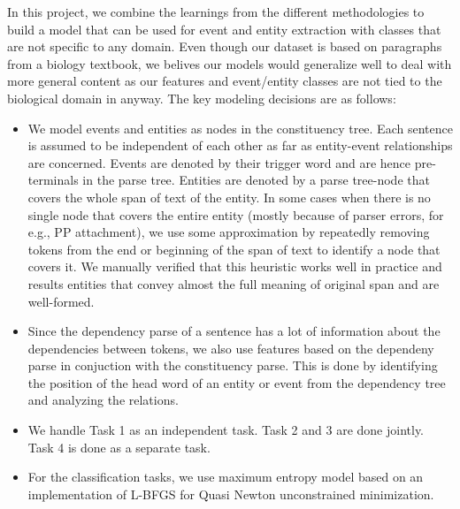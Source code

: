 In this project, we combine the learnings from the different methodologies to build a model that can be used for event and entity extraction with classes that are not specific to any domain. Even though our dataset is based on paragraphs from a biology textbook, we belives our models would generalize well to deal with more general content as our features and event/entity classes are not tied to the biological domain in anyway. The key modeling decisions are as follows:

\begin{itemize}
\item We model events and entities as nodes in the constituency tree. Each sentence is assumed to be independent of each other as far as entity-event relationships are concerned. Events are denoted by their trigger word and are hence pre-terminals in the parse tree. Entities are denoted by a parse tree-node that covers the whole span of text of the entity. In some cases when there is no single node that covers the entire entity (mostly because of parser errors, for e.g., PP attachment), we use some approximation by repeatedly removing tokens from the end or beginning of the span of text to identify a node that covers it. We manually verified that this heuristic works well in practice and results entities that convey almost the full meaning of original span and are well-formed.
\item Since the dependency parse of a sentence has a lot of information about the dependencies between tokens, we also use features based on the dependeny parse in conjuction with the constituency parse. This is done by identifying the position of the head word of an entity or event from the dependency tree and analyzing the relations.
\item We handle Task 1 as an independent task. Task 2 and 3 are done jointly. Task 4 is done as a separate task.
\item For the classification tasks, we use maximum entropy model based on an implementation of L-BFGS for Quasi Newton unconstrained minimization.
\end{itemize}